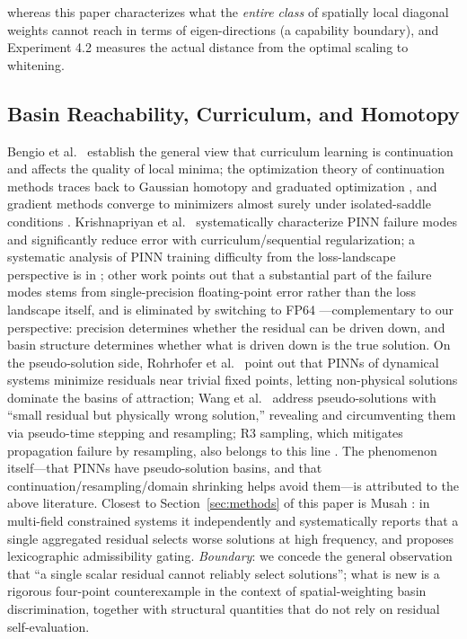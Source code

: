 \documentclass[11pt]{article}
\numberwithin{equation}{section}
\begin{document}
whereas this paper characterizes what the \emph{entire class} of spatially local diagonal weights cannot reach in terms of eigen-directions (a capability boundary), and Experiment 4.2 measures the actual distance from the optimal scaling to whitening.

\subsection{Basin Reachability, Curriculum, and Homotopy}\label{sec:rel-curriculum}
Bengio et al.\ \cite{Bengio2009} establish the general view that curriculum learning is continuation and affects the quality of local minima; the optimization theory of continuation methods traces back to Gaussian homotopy and graduated optimization \cite{Mobahi2015,Hazan2016}, and gradient methods converge to minimizers almost surely under isolated-saddle conditions \cite{Lee2016}. Krishnapriyan et al.\ \cite{Krishnapriyan2021} systematically characterize PINN failure modes and significantly reduce error with curriculum/sequential regularization; a systematic analysis of PINN training difficulty from the loss-landscape perspective is in \cite{Rathore2024}; other work points out that a substantial part of the failure modes stems from single-precision floating-point error rather than the loss landscape itself, and is eliminated by switching to FP64 \cite{FP64Xu2025}---complementary to our perspective: precision determines whether the residual can be driven down, and basin structure determines whether what is driven down is the true solution. On the pseudo-solution side, Rohrhofer et al.\ \cite{Rohrhofer2022} point out that PINNs of dynamical systems minimize residuals near trivial fixed points, letting non-physical solutions dominate the basins of attraction; Wang et al.\ \cite{WangPseudo2026} address pseudo-solutions with ``small residual but physically wrong solution,'' revealing and circumventing them via pseudo-time stepping and resampling; R3 sampling, which mitigates propagation failure by resampling, also belongs to this line \cite{Daw2022Evo}. The phenomenon itself---that PINNs have pseudo-solution basins, and that continuation/resampling/domain shrinking helps avoid them---is attributed to the above literature. Closest to Section~\ref{sec:methods} of this paper is Musah \cite{Musah2026}: in multi-field constrained systems it independently and systematically reports that a single aggregated residual selects worse solutions at high frequency, and proposes lexicographic admissibility gating. \emph{Boundary}: we concede the general observation that ``a single scalar residual cannot reliably select solutions''; what is new is a rigorous four-point counterexample in the context of spatial-weighting basin discrimination, together with structural quantities that do not rely on residual self-evaluation.
\end{document}
